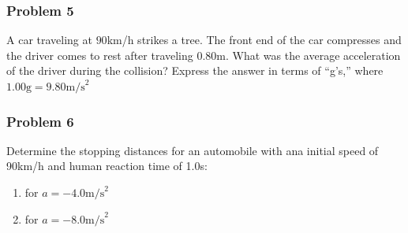 \documentclass[
  letterpaper,
  DIV=11,
  numbers=noendperiod]{scrartcl}
\providecommand{\tightlist}{%
  \setlength{\itemsep}{0pt}\setlength{\parskip}{0pt}}\usepackage{longtable,booktabs,array}
\begin{document}
\hypertarget{problem-5}{%
\subsubsection{Problem 5}\label{problem-5}}

A car traveling at \(90\)km/h strikes a tree. The front end of the car
compresses and the driver comes to rest after traveling \(0.80\)m. What
was the average acceleration of the driver during the collision? Express
the answer in terms of ``g's,'' where
\(1.00\text{g} = 9.80 \text{m/s}^2\)

\hypertarget{problem-6}{%
\subsubsection{Problem 6}\label{problem-6}}

Determine the stopping distances for an automobile with ana initial
speed of 90km/h and human reaction time of 1.0s:

\begin{enumerate}
\def\labelenumi{(\alph{enumi})}
\tightlist
\item
  for \(a =-4.0 \text{m/s}^2\)
\item
  for \(a = -8.0 \text{m/s}^2\)
\end{enumerate}
\end{document}
